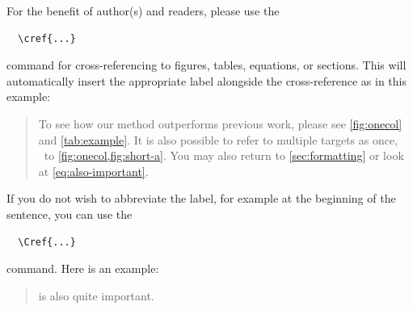 {For the benefit of author(s) and readers, please use the
{\small\begin{verbatim}
  \cref{...}
\end{verbatim}}  command for cross-referencing to figures, tables, equations, or sections.
This will automatically insert the appropriate label alongside the cross-reference as in this example:
\begin{quotation}
  To see how our method outperforms previous work, please see \cref{fig:onecol} and \cref{tab:example}.
  It is also possible to refer to multiple targets as once, \eg~to \cref{fig:onecol,fig:short-a}.
  You may also return to \cref{sec:formatting} or look at \cref{eq:also-important}.
\end{quotation}
If you do not wish to abbreviate the label, for example at the beginning of the sentence, you can use the
{\small\begin{verbatim}
  \Cref{...}
\end{verbatim}}
command. Here is an example:
\begin{quotation}
   is also quite important.
\end{quotation}







}
